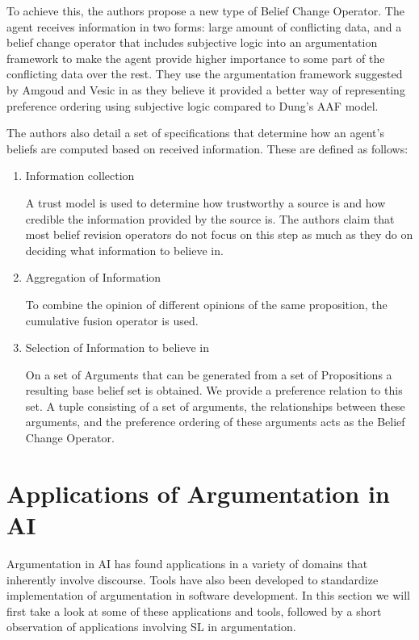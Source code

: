 \documentclass[sigconf]{acmart}
\begin{document}
To achieve this, the authors propose a new type of Belief Change Operator. The agent receives information in two forms: large amount of conflicting data, and a belief change operator that includes subjective logic
into an argumentation framework to make the agent provide higher importance to some part of the conflicting data over the rest. They use 
the argumentation framework suggested by Amgoud and Vesic in \cite{AMGOUD2014585} as they believe it provided a better way of representing preference
ordering using subjective logic compared to Dung's \cite{DUNG1995321} AAF model.

The authors also detail a set of specifications that determine how an agent's beliefs are computed based on received information. These are defined as follows:

\begin{enumerate}
  \item Information collection
  
  A trust model is used to determine how trustworthy a source is and how credible the information provided by the source is. The authors claim that 
    most belief revision operators do not focus on this step as much as they do on deciding what information to believe in.

  
  \item Aggregation of Information
  
  To combine the opinion of different opinions of the same proposition, the cumulative fusion operator
  is used.

  \item Selection of Information to believe in
  
  On a set of Arguments that can be generated from a set of Propositions a resulting base belief set is obtained. We provide a 
  preference relation to this set. A tuple consisting of a set of arguments, the relationships between these arguments, and the preference ordering 
  of these arguments acts as the Belief Change Operator.

  
\end{enumerate}
\section{Applications of Argumentation in AI}
Argumentation in AI has found applications in a variety of domains that inherently involve discourse. Tools have also been developed to standardize implementation of argumentation in software development. In this section we will first take a look at some of these applications and tools, followed by a short observation of applications involving SL in argumentation.
\end{document}

